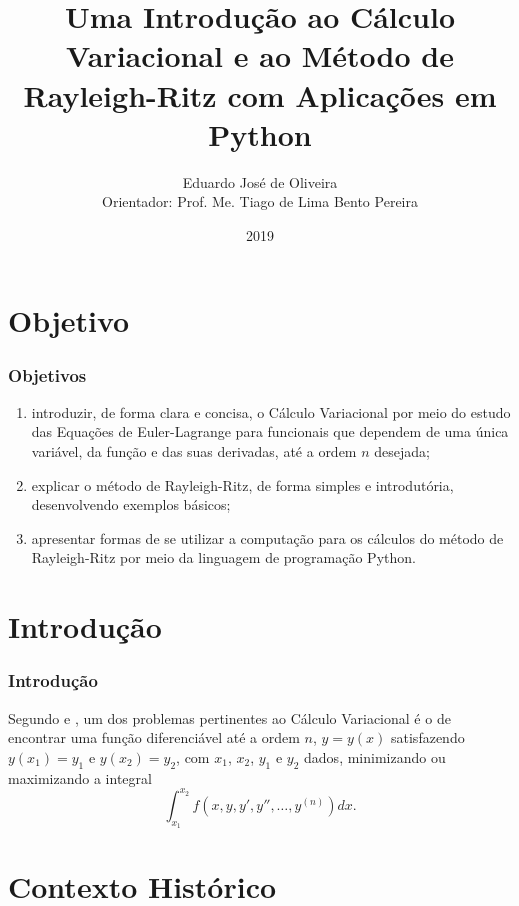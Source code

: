 \documentclass{beamer}
\title[Cálculo Variacional e o Método de Rayleigh-Ritz]{Uma Introdução ao Cálculo Variacional e ao Método de Rayleigh-Ritz com Aplicações em Python}
\author[Eduardo José de Oliveira]{
	Eduardo José de Oliveira\\
	Orientador: Prof. Me. Tiago de Lima Bento Pereira
}
\institute[Universidade Estadual de Goiás]{
	UNIVERSIDADE ESTADUAL DE GOIÁS\\
  	Câmpus Anápolis de Ciências Exatas e Tecnológicas Henrique Santillo \\
  	Matemática
}
\date[2019]{2019}
\begin{document}
	\begin{frame}[plain]
	  \titlepage
	\end{frame}

	\section{Objetivo}

	\begin{frame}
		\frametitle{Objetivos}
	
		\begin{enumerate}
			\justifying
			\item introduzir, de forma clara e concisa, o Cálculo Variacional por meio do estudo das Equações de Euler-Lagrange para funcionais que dependem de uma única variável, da função e das suas derivadas, até a ordem $n$ desejada;
			
			\item explicar o método de Rayleigh-Ritz, de forma simples e introdutória, desenvolvendo exemplos básicos;
			
			\item apresentar formas de se utilizar a computação para os cálculos do método de Rayleigh-Ritz por meio da linguagem de programação Python.
		\end{enumerate}
	\end{frame}
	
	\section{Introdução}
	\begin{frame}
		\frametitle{Introdução}
		
		\justify
		Segundo  e , um dos problemas pertinentes ao Cálculo Variacional é o de encontrar uma função diferenciável até a ordem $n$, $y=y(x)$ satisfazendo $y(x_1)=y_1$ e $y(x_2)=y_2$, com $x_1$, $x_2$, $y_1$ e $y_2$ dados, minimizando ou maximizando a integral
		$$
			\int_{x_1}^{x_2} f(x, y, y', y'', \dots, y^{(n)})dx\text{.}
		$$
	\end{frame}

	\section{Contexto Histórico}
\end{document}
